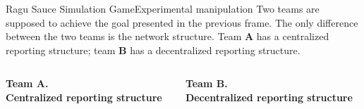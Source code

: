 \documentclass[notes, aspectratio=1610]{beamer}
\begin{document}
\begin{frame}{Ragu Sauce Simulation Game}{Experimental manipulation}
	Two teams are supposed to achieve the goal presented in the previous 
	frame. The only difference between the two teams is the network
	structure. Team \textbf{A} has a centralized reporting structure;
	team \textbf{B} has a decentralized reporting structure.
	\vspace{-1em}
	\begin{columns}[t]
		\begin{column}{0.5\textwidth}
			\begin{center}
			\textbf{Team A.\\Centralized reporting structure}

			

			\end{center}
		\end{column}
		\begin{column}{0.5\textwidth}
			\begin{center}
			\textbf{Team B.\\Decentralized reporting structure}
			
			
			\end{center}
		\end{column}
	\end{columns}
\end{frame}
\end{document}
